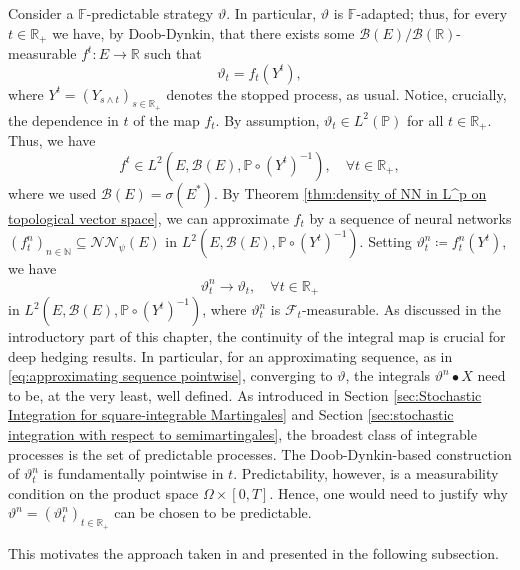 \documentclass[11pt,a4paper,twoside,openany]{report}
\numberwithin{equation}{section}
\theoremstyle{plain} %
\theoremstyle{definition} %
\theoremstyle{remark} %
\let\parencite\authnumparencite
\begin{document}
Consider a \(\mathbb{F}\)-predictable strategy \(\vartheta\). In particular, \(\vartheta\) is \(\mathbb{F}\)-adapted; thus, for every \(t\in\mathbb{R}_+\) we have, by Doob-Dynkin, that there exists some \(\mathcal{B}(E)/\mathcal{B}(\mathbb{R})\)-measurable \(f^t:E\to\mathbb{R}\) such that
\begin{equation*}
    \vartheta_t=f_t(Y^t),
\end{equation*}
where \(Y^t=(Y_{s\wedge t})_{s\in\mathbb{R}_+}\) denotes the stopped process, as usual. Notice, crucially, the dependence in \(t\) of the map \(f_t\). By assumption, 
\(
    \vartheta_t\in L^2(\mathbb{P})
\) for all \(t\in\mathbb{R}_+\).
Thus, we have
\begin{equation*}
    f^t\in L^2(E,\mathcal{B}(E),\mathbb{P}\circ(Y^t)^{-1}),\quad\forall t\in\mathbb{R}_+,
\end{equation*}
where we used \(\mathcal{B}(E)=\sigma(E^*)\).
By Theorem \ref{thm:density of NN in L^p on topological vector space}, we can approximate \(f_t\) by a sequence of neural networks \((f_t^n)_{n\in\mathbb{N}}\subseteq\mathcal{NN}_\psi(E)\) in \(L^2(E,\mathcal{B}(E),\mathbb{P}\circ(Y^t)^{-1})\). Setting \(\vartheta^n_t\coloneqq f^n_t(Y^t)\), we have
\begin{equation}\label{eq:approximating sequence pointwise}
    \vartheta_t^n\to\vartheta_t,\quad\forall t\in\mathbb{R}_+
\end{equation}
in \(L^2(E,\mathcal{B}(E),\mathbb{P}\circ(Y^t)^{-1})\),
where \(\vartheta_t^n\) is \(\mathcal{F}_t\)-measurable.
As discussed in the introductory part of this chapter, the continuity of the integral map is crucial for deep hedging results. In particular, for an approximating sequence, as in \eqref{eq:approximating sequence pointwise}, converging to \(\vartheta\), the integrals \(\vartheta^n\bullet X\) need to be, at the very least, well defined. As introduced in Section \ref{sec:Stochastic Integration for square-integrable Martingales} and Section \ref{sec:stochastic integration with respect to semimartingales}, the broadest class of integrable processes is the set of predictable processes. The Doob-Dynkin-based construction of \(\vartheta_t^n\) is fundamentally pointwise in \(t\). Predictability, however, is a measurability condition on the product space \(\Omega\times[0,T]\). Hence, one would need to justify why \(\vartheta^n=(\vartheta^n_t)_{t\in\mathbb{R}_+}\) can be chosen to be predictable. 


This motivates the approach taken in \parencite[Ch.5]{Arandjelovic2025} and presented in the following subsection.
\end{document}

